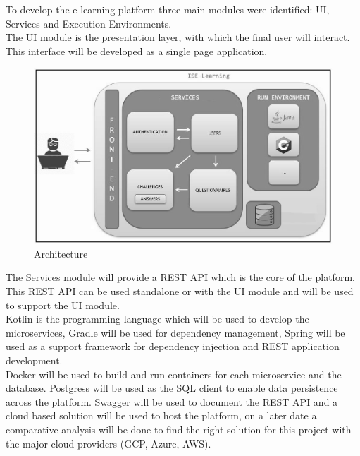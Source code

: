 To develop the e-learning platform three main modules were identified: UI, Services and Execution Environments.
\\
The UI module is the presentation layer, with which the final user will interact. This interface will be developed as a single page application.\cite[p. 2] {ref2}
\\
	\begin{figure}
  		\includegraphics[scale=0.6]{./imgs/arquitectura.JPG}
  		\caption{Architecture}
  		\label{fig:architecture}
	\end{figure} 
The Services module will provide a REST API which is the core of the platform.
\\
This REST API can be used standalone or with the UI module and will be used to support the UI module. 
\iffalse
\\
Kotlin is the programming language which will be used to develop the microservices, Gradle will be used for dependency management, Spring will be used as a support framework for dependency injection and REST application development.
\\
Docker will be used to build and run containers for each microservice and the database. Postgress will be used as the SQL client to enable data persistence across the platform. Swagger will be used to document the REST API and a cloud based solution will be used to host the platform, on a later date a comparative analysis will be done to find the right solution for this project with the major cloud providers (GCP, Azure, AWS).
\\

